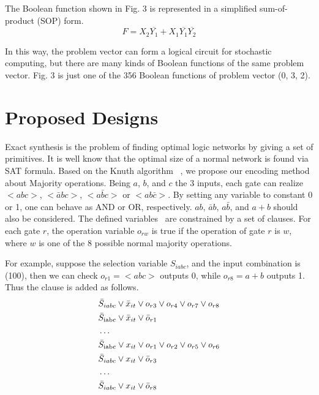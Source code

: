 \documentclass[conference,letterpaper]{IEEEtran}
\begin{document}
The Boolean function shown in Fig. 3 is represented in a simplified sum-of-product (SOP) form.
\begin{equation}
F=X_{2} \overline{Y_{1}}+X_{1} \overline{Y_{1}}     \overline{Y_{2}}
\end{equation}

In this way, the problem vector can form a logical circuit for stochastic computing, but there are many kinds of Boolean functions of the same problem vector. Fig. 3 is just one of the 356 Boolean functions of problem vector (0, 3, 2).


\section*{Proposed Designs}
Exact synthesis is the problem of finding optimal logic networks by giving a set of primitives. It is well know that the optimal size of a normal network is found via SAT formula\cite{3}. Based on the Knuth algorithm ~\cite{4}, we propose our encoding method about Majority operations. Being $a$, $b$, and $c$ the 3 inputs, each gate can realize $<a b c>$, $<\bar{a} b c>$, $<a \bar{b} c>$ or $<a b \bar{c}>$. By setting any variable to constant 0 or 1, one can behave as AND or OR, respectively. $a b$, $\bar{a} b$, $a \bar{b}$, and $a+b$ should also be considered. The defined variables~\cite{5} are constrained by a set of clauses. For each gate $r$, the operation variable  $o_{r w}$ is true if the operation of gate $r$ is $w$, where $w$ is one of the 8 possible normal majority operations.

For example, suppose the selection variable $S_{i a b c}$, and the input combination is (100), then we can check $o_{r 1}=<abc>$ outputs 0, while $o_{r 8}=a+b$ outputs 1. Thus the clause is added as follows.
\begin{equation}                     %
\begin{split}
&\bar{S}_{i a b c} \vee \bar{x}_{i t} \vee o_{r 3} \vee o_{r 4} \vee o_{r 7} \vee o_{r 8} \\
&\bar{S}_{\text {iabc}} \vee \bar{x}_{i t} \vee \bar{o}_{r 1} \\
\centering &\ldots \\
&\bar{S}_{\text {iabc}} \vee x_{i t} \vee {o}_{r 1} \vee{o}_{r 2} \vee{o}_{r 5} \vee{o}_{r 6}\\
&\bar{S}_{i a b c} \vee x_{i t} \vee \bar{o}_{r 3}\\
\centering &\ldots \\
&\bar{S}_{i a b c} \vee x_{i t} \vee \bar{o}_{r 8}\\
\end{split}
\end{equation}
\end{document}
